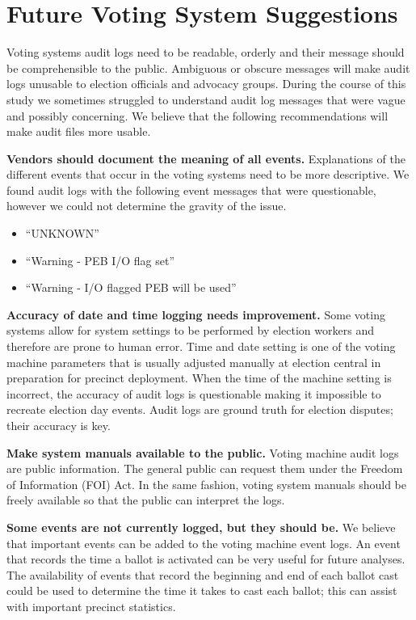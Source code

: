 \section{Future Voting System Suggestions}
Voting systems audit logs need to be readable, orderly and their message should be  comprehensible to the public. Ambiguous or obscure messages will make audit logs unusable to election officials and advocacy groups. During the course of this study we sometimes struggled to understand audit log messages that were vague and possibly concerning. We believe that the following recommendations will make audit files more usable.

\textbf{Vendors should document the meaning of all events.} Explanations of the different events that occur in the voting systems need to be more descriptive.  We found audit logs with the following event messages that were questionable, however we could not determine the gravity of the issue.
\begin{itemize}
	\item \textquotedblleft UNKNOWN\textquotedblright
	\item \textquotedblleft Warning - PEB I/O flag set\textquotedblright
	\item \textquotedblleft Warning - I/O flagged PEB will be used\textquotedblright
\end{itemize}

\textbf{Accuracy of date and time logging needs improvement.} Some voting systems allow for system settings to be performed by election workers and therefore are prone to human error. Time and date setting is one of the voting machine parameters that is usually adjusted manually at election central in preparation for precinct deployment. When the time of the machine setting is incorrect, the accuracy of audit logs is questionable making it impossible to recreate election day events. Audit logs are ground truth for election disputes; their accuracy is key.

\textbf{Make system manuals available to the public.} Voting machine audit logs are public information. The general public can request them under the Freedom of Information (FOI) Act. In the same fashion, voting system manuals should be freely available so that the public can interpret the logs. 

\textbf{Some events are not currently logged, but they should be.} We believe that important events can be added to the voting machine event logs. An event that records the time a ballot is activated can be very useful for future analyses. The availability of events that record the beginning and end of each ballot cast could be used to determine the time it takes to cast each ballot; this can assist with important precinct statistics.